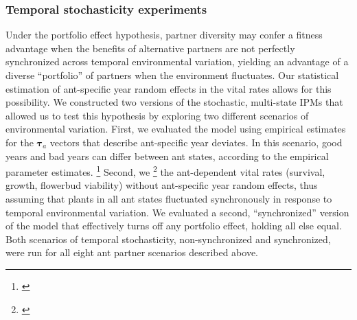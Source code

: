 \documentclass[11pt]{article}
\newcommand{\tom}[2]{{\color{red}{#1}}\footnote{\textit{\color{red}{#2}}}}
\begin{document}
\subsubsection*{Temporal stochasticity experiments}
Under the portfolio effect hypothesis, partner diversity may confer a fitness advantage when the benefits of alternative partners are not perfectly synchronized across temporal environmental variation, yielding an advantage of a diverse ``portfolio'' of partners when the environment fluctuates. 
Our statistical estimation of ant-specific year random effects in the vital rates allows for this possibility. 
We constructed two versions of the stochastic, multi-state IPMs that allowed us to test this hypothesis by exploring two different scenarios of environmental variation. 
First, we evaluated the model using empirical estimates for the $\pmb{\tau}_{a}$ vectors that describe ant-specific year deviates. 
In this scenario, good years and bad years can differ between ant states, according to the empirical parameter estimates. 
\tom{We also quantified from the fitted random effects how tightly inter-annual variation was correlated between ant states.}{Worth doing!} 
Second, we \tom{re-fit}{I think this is correct? The alternative would be to choose one ant state to define the year effects, or perhaps average them.} the ant-dependent vital rates (survival, growth, flowerbud viability) without ant-specific year random effects, thus assuming that plants in all ant states fluctuated synchronously in response to temporal environmental variation. 
We evaluated a second, ``synchronized'' version of the model that effectively turns off any portfolio effect, holding all else equal. 
Both scenarios of temporal stochasticity, non-synchronized and synchronized, were run for all eight ant partner scenarios described above. 
\end{document}
